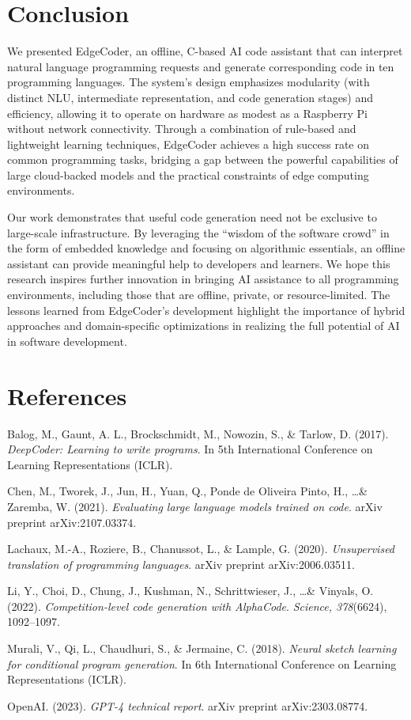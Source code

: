 \documentclass[12pt]{article}
\begin{document}
\section{Conclusion}
\noindent 
We presented EdgeCoder, an offline, C-based AI code assistant that can interpret natural language programming requests and generate corresponding code in ten programming languages. The system’s design emphasizes modularity (with distinct NLU, intermediate representation, and code generation stages) and efficiency, allowing it to operate on hardware as modest as a Raspberry Pi without network connectivity. Through a combination of rule-based and lightweight learning techniques, EdgeCoder achieves a high success rate on common programming tasks, bridging a gap between the powerful capabilities of large cloud-backed models and the practical constraints of edge computing environments.

Our work demonstrates that useful code generation need not be exclusive to large-scale infrastructure. By leveraging the “wisdom of the software crowd” in the form of embedded knowledge and focusing on algorithmic essentials, an offline assistant can provide meaningful help to developers and learners. We hope this research inspires further innovation in bringing AI assistance to all programming environments, including those that are offline, private, or resource-limited. The lessons learned from EdgeCoder’s development highlight the importance of hybrid approaches and domain-specific optimizations in realizing the full potential of AI in software development. 

\section*{References}
\noindent\hangindent=0.5in Balog, M., Gaunt, A. L., Brockschmidt, M., Nowozin, S., \& Tarlow, D. (2017). \textit{DeepCoder: Learning to write programs}. In 5th International Conference on Learning Representations (ICLR).
\par
\noindent\hangindent=0.5in Chen, M., Tworek, J., Jun, H., Yuan, Q., Ponde de Oliveira Pinto, H., \dots \& Zaremba, W. (2021). \textit{Evaluating large language models trained on code}. arXiv preprint arXiv:2107.03374.
\par
\noindent\hangindent=0.5in Lachaux, M.-A., Roziere, B., Chanussot, L., \& Lample, G. (2020). \textit{Unsupervised translation of programming languages}. arXiv preprint arXiv:2006.03511.
\par
\noindent\hangindent=0.5in Li, Y., Choi, D., Chung, J., Kushman, N., Schrittwieser, J., \dots \& Vinyals, O. (2022). \textit{Competition-level code generation with AlphaCode}. \textit{Science, 378}(6624), 1092–1097.
\par
\noindent\hangindent=0.5in Murali, V., Qi, L., Chaudhuri, S., \& Jermaine, C. (2018). \textit{Neural sketch learning for conditional program generation}. In 6th International Conference on Learning Representations (ICLR).
\par
\noindent\hangindent=0.5in OpenAI. (2023). \textit{GPT-4 technical report}. arXiv preprint arXiv:2303.08774.
\par
\end{document}
